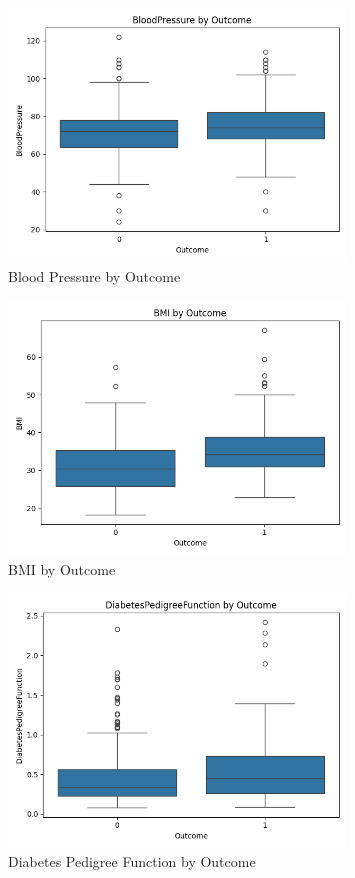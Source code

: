 \documentclass[12pt,a4paper]{article}
\begin{document}
\begin{figure}[H]
\centering
\includegraphics[width=0.8\textwidth]{../plots/boxplot_BloodPressure.png}
\caption{Blood Pressure by Outcome}
\end{figure}

\begin{figure}[H]
\centering
\includegraphics[width=0.8\textwidth]{../plots/boxplot_BMI.png}
\caption{BMI by Outcome}
\end{figure}

\begin{figure}[H]
\centering
\includegraphics[width=0.8\textwidth]{../plots/boxplot_DiabetesPedigreeFunction.png}
\caption{Diabetes Pedigree Function by Outcome}
\end{figure}
\end{document}
